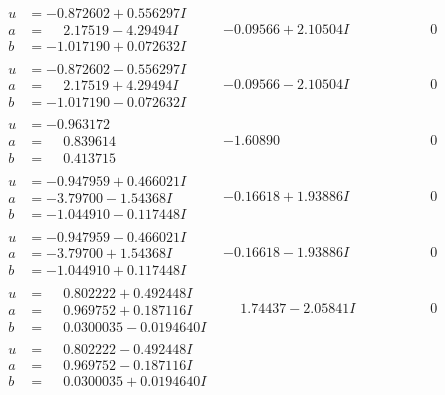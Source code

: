 \documentclass[1p]{elsarticle_modified}
\theoremstyle{definition}
\begin{document}
$$\begin{array}{c|c|c}
\begin{aligned}
u &= -0.872602 + 0.556297 I \\
a &= \phantom{-}2.17519 - 4.29494 I \\
b &= -1.017190 + 0.072632 I\end{aligned}
 & -0.09566 + 2.10504 I & \phantom{-0.000000 } 0 \\ \hline\begin{aligned}
u &= -0.872602 - 0.556297 I \\
a &= \phantom{-}2.17519 + 4.29494 I \\
b &= -1.017190 - 0.072632 I\end{aligned}
 & -0.09566 - 2.10504 I & \phantom{-0.000000 } 0 \\ \hline\begin{aligned}
u &= -0.963172\phantom{ +0.000000I} \\
a &= \phantom{-}0.839614\phantom{ +0.000000I} \\
b &= \phantom{-}0.413715\phantom{ +0.000000I}\end{aligned}
 & -1.60890\phantom{ +0.000000I} & \phantom{-0.000000 } 0 \\ \hline\begin{aligned}
u &= -0.947959 + 0.466021 I \\
a &= -3.79700 - 1.54368 I \\
b &= -1.044910 - 0.117448 I\end{aligned}
 & -0.16618 + 1.93886 I & \phantom{-0.000000 } 0 \\ \hline\begin{aligned}
u &= -0.947959 - 0.466021 I \\
a &= -3.79700 + 1.54368 I \\
b &= -1.044910 + 0.117448 I\end{aligned}
 & -0.16618 - 1.93886 I & \phantom{-0.000000 } 0 \\ \hline\begin{aligned}
u &= \phantom{-}0.802222 + 0.492448 I \\
a &= \phantom{-}0.969752 + 0.187116 I \\
b &= \phantom{-}0.0300035 - 0.0194640 I\end{aligned}
 & \phantom{-}1.74437 - 2.05841 I & \phantom{-0.000000 } 0 \\ \hline\begin{aligned}
u &= \phantom{-}0.802222 - 0.492448 I \\
a &= \phantom{-}0.969752 - 0.187116 I \\
b &= \phantom{-}0.0300035 + 0.0194640 I\end{aligned}

\end{array}$$
\end{document}
